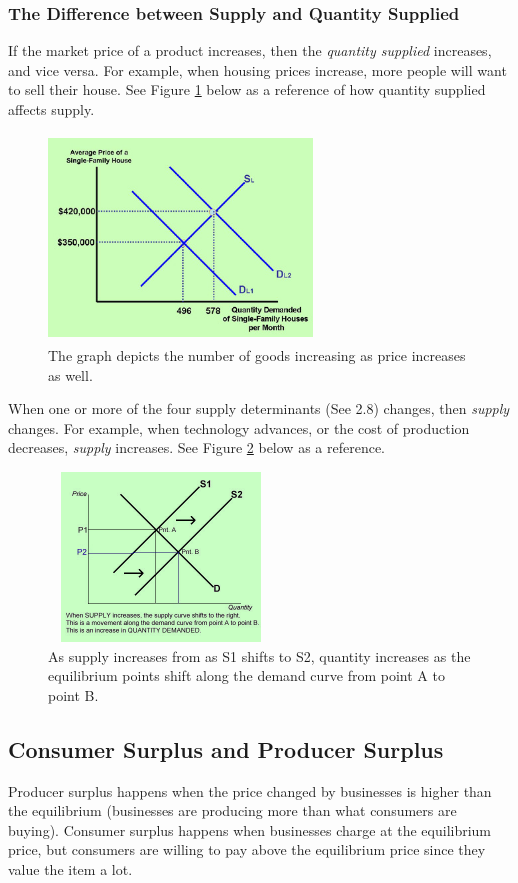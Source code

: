 \documentclass[a4paper, 12pt] {article}
\begin{document}
\subsubsection{The Difference between Supply and Quantity Supplied}
If the market price of a product increases, then the \emph{quantity supplied}
increases, and vice versa. For example, when housing prices increase, more
people will want to sell their house. See Figure \ref{fig:quant_supp} below as a
reference of how quantity supplied affects supply.
\begin{figure}[ht]
    \center
    \includegraphics[height=5.5cm, width=7cm]{quantity_supplied.jpg}
    \caption{The graph depicts the number of goods increasing as price increases
    as well.}
    \label{fig:quant_supp}
\end{figure}

When one or more of the four supply determinants (See 2.8) changes, then \emph{
supply} changes. For example, when technology advances, or the cost of production
decreases, \emph{supply} increases. See Figure \ref{fig:supply_quant_shift} below 
as a reference.
\begin{figure}[ht]
    \center
    \includegraphics[height=4.5cm, width=6cm]{supply_quant_shift.jpg}
    \caption{As supply increases from as S1 shifts to S2, quantity increases as
    the equilibrium points shift along the demand curve from point A to point B.}
    \label{fig:supply_quant_shift}
\end{figure}

\subsection{Consumer Surplus and Producer Surplus}
Producer surplus happens when the price changed by businesses is higher than the
equilibrium (businesses are producing more than what consumers are buying).
Consumer surplus happens when businesses charge at the equilibrium price, but
consumers are willing to pay above the equilibrium price since they value the 
item a lot.
\end{document}
